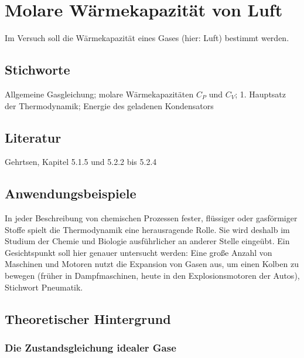 \chapter{Molare Wärmekapazität von Luft}
\label{v:6}

Im Versuch soll die Wärmekapazität eines Gases (hier: Luft) bestimmt werden.

\section{Stichworte}

Allgemeine Gasgleichung; molare Wärmekapazitäten $C_P$ und $C_V$; 1. Hauptsatz der Thermodynamik; Energie des geladenen Kondensators
%
\section{Literatur}

Gehrtsen, Kapitel 5.1.5 und 5.2.2 bis 5.2.4
%
\section{Anwendungsbeispiele}
%
In jeder Beschreibung von chemischen Prozessen fester, flüssiger oder gasförmiger Stoffe spielt die Thermodynamik eine herausragende Rolle. Sie wird deshalb im Studium der Chemie und Biologie ausführlicher an anderer Stelle eingeübt. Ein Gesichtspunkt soll hier genauer untersucht werden: Eine große Anzahl von Maschinen und Motoren nutzt die Expansion von Gasen aus, um einen Kolben zu bewegen (früher in Dampfmaschinen, heute in den Explosionsmotoren der Autos), Stichwort Pneumatik.

%
\section{Theoretischer Hintergrund}

\subsection{Die Zustandsgleichung idealer Gase}

